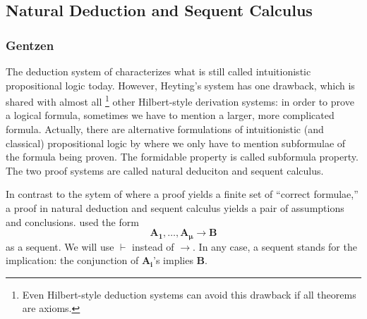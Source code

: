 \subsection{Natural Deduction and Sequent Calculus}

\subsubsection{Gentzen}

The deduction system of \citet{heyting1930} characterizes what is still
called intuitionistic propositional logic today. However, Heyting's
system has one drawback, which is shared with almost all%
\footnote{Even Hilbert-style deduction
systems can avoid this drawback if all theorems are axioms.} other
Hilbert-style derivation systems:
in order to prove a logical formula, sometimes we have to
mention a larger, more complicated formula.  Actually, there
are alternative formulations of intuitionistic (and classical)
propositional logic by \citet{gentzen} where we only have to
mention subformulae of the formula being proven.
The formidable property is called subformula property.
The two proof systems are called natural deduciton and sequent calculus.

In contrast to the sytem of \citet{heyting1930} where a proof yields a
finite set of ``correct formulae,'' a proof in natural deduction and
sequent calculus yields a pair of assumptions and conclusions.
\citet{gentzen} used the form
\[
 \mathbf{A_1},\ldots,\mathbf{A_{\boldsymbol\mu}}\longrightarrow \mathbf{B}
\]
as a sequent.  We will use $\vdash$ instead of $\longrightarrow$.
In any case, a sequent stands for the implication:
the conjunction of $\mathbf{A_i}$'s implies $\mathbf{B}$.

